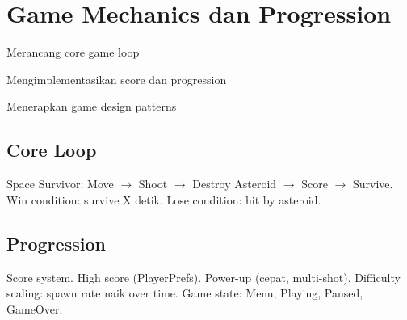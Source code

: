 \section{Game Mechanics dan Progression}

\begin{learningoutcomes}
\item Merancang core game loop
\item Mengimplementasikan score dan progression
\item Menerapkan game design patterns
\end{learningoutcomes}

\subsection{Core Loop}

Space Survivor: Move $\rightarrow$ Shoot $\rightarrow$ Destroy Asteroid $\rightarrow$ Score $\rightarrow$ Survive. Win condition: survive X detik. Lose condition: hit by asteroid.

\subsection{Progression}

Score system. High score (PlayerPrefs). Power-up (cepat, multi-shot). Difficulty scaling: spawn rate naik over time. Game state: Menu, Playing, Paused, GameOver.
